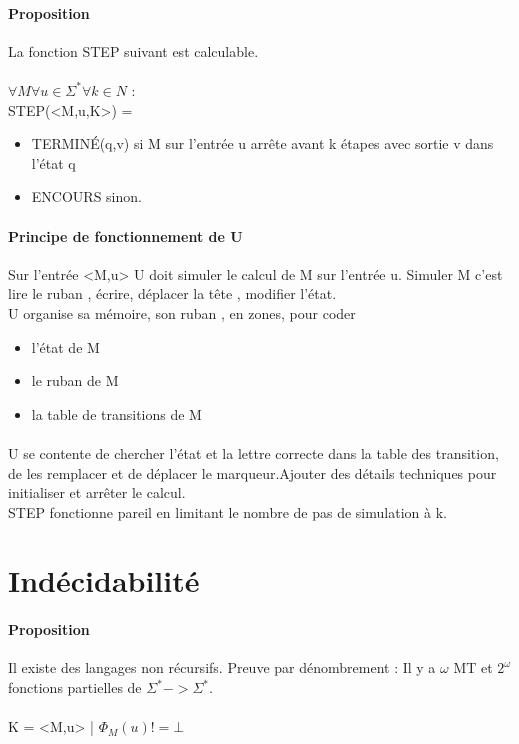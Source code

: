 \documentclass{article}
\begin{document}
{\paragraph{Proposition} La fonction STEP suivant est calculable. \\\\$\forall M\forall u\in \Sigma^{*} \forall k \in N$ : \\ STEP(<M,u,K>) = 
\begin{itemize}
\item TERMINÉ(q,v) si M sur l'entrée u arrête avant k étapes avec sortie v dans l'état q
\item ENCOURS sinon.
\end{itemize}
\paragraph{Principe de fonctionnement de U} Sur l'entrée <M,u> U doit simuler le calcul de M sur l'entrée u. Simuler M c'est lire le ruban , écrire, déplacer la tête , modifier l'état.\\U organise sa mémoire, son ruban , en zones, pour coder \begin{itemize}
\item l'état de M
\item le ruban de M
\item la table de transitions de M
\end{itemize}
\paragraph{} U se contente de chercher l'état et la lettre correcte dans la table des transition, de les remplacer et de déplacer le marqueur.Ajouter des détails techniques pour initialiser et arrêter le calcul.\\STEP fonctionne pareil en limitant le nombre de pas de simulation à k.
\section{Indécidabilité}
\paragraph{Proposition} Il existe des langages non récursifs. Preuve par dénombrement  : Il y a $\omega$ MT et $2^{\omega}$ fonctions partielles de $\Sigma^{*} -> \Sigma^{*}$.\\\\ K = { <M,u> | $\Phi_{M}(u) != \bot$}
}
\end{document}
